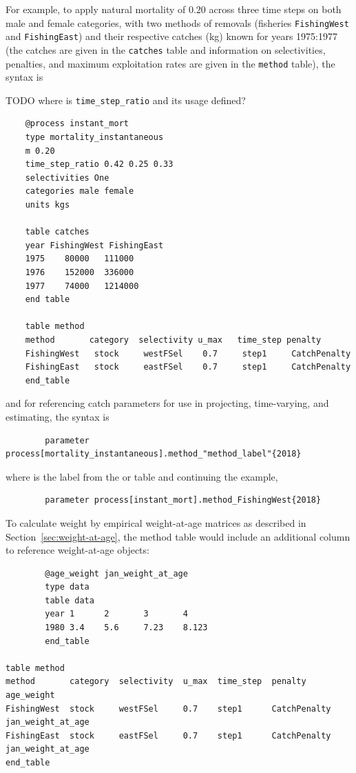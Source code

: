 For example, to apply natural mortality of $0.20$ across three time steps on both male and female categories, with two methods of removals (fisheries \texttt{FishingWest} and \texttt{FishingEast}) and their respective catches (kg) known for years 1975:1977 (the catches are given in the \texttt{catches} table and information on selectivities, penalties, and maximum exploitation rates are given in the \texttt{method} table), the syntax is

TODO where is \texttt{time\_step\_ratio} and its usage defined?

{\small{\begin{verbatim}
	@process instant_mort
	type mortality_instantaneous
	m 0.20
	time_step_ratio 0.42 0.25 0.33
	selectivities One
	categories male female
	units kgs

	table catches
	year FishingWest FishingEast
	1975	80000	111000
	1976	152000	336000
	1977	74000	1214000
	end table

	table method
	method       category  selectivity u_max   time_step penalty
	FishingWest   stock     westFSel    0.7     step1     CatchPenalty
	FishingEast   stock     eastFSel    0.7     step1     CatchPenalty
	end_table
	\end{verbatim}}}

and for referencing catch parameters for use in projecting, time-varying, and estimating, the syntax is

{\small{\begin{verbatim}
		parameter process[mortality_instantaneous].method_"method_label"{2018}
		\end{verbatim}}}

where  is the label from the  or  table and continuing the example,

{\small{\begin{verbatim}
		parameter process[instant_mort].method_FishingWest{2018}
		\end{verbatim}}}

To calculate weight by empirical weight-at-age matrices as described in Section~\ref{sec:weight-at-age}, the method table would include an additional column to reference weight-at-age objects:

{\small{\begin{verbatim}
		@age_weight jan_weight_at_age
		type data
		table data
		year 1 		2 		3 		4
		1980 3.4	5.6		7.23 	8.123
		end_table

table method
method       category  selectivity  u_max  time_step  penalty       age_weight
FishingWest  stock     westFSel     0.7    step1      CatchPenalty  jan_weight_at_age
FishingEast  stock     eastFSel     0.7    step1      CatchPenalty  jan_weight_at_age
end_table
\end{verbatim}}}


